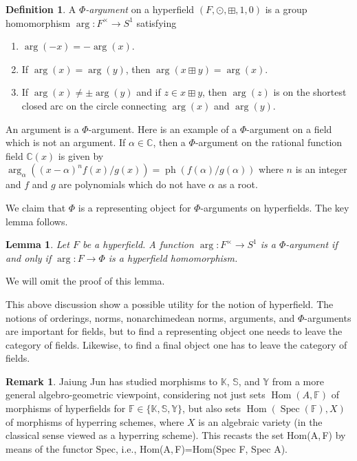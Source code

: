 \documentclass[10pt, preprint]{article}
\newtheorem{lemma}[theorem]{Lemma}
\theoremstyle{definition}
\newtheorem{definition}[theorem]{Definition}
\newtheorem{remark}[theorem]{Remark}
\begin{document}
\begin{definition}
A \emph{$\Phi $-argument} on a hyperfield $(F,\odot ,\boxplus ,1,0)$ is
a group homomorphism $\arg : F^{\times }\to S^{1}$ satisfying\vspace*{-3pt}
%
\begin{enumerate}%
\item
$\arg (-x) = -\arg (x)$.
%
\item
If $\arg (x) = \arg (y)$, then $\arg (x \boxplus y) = \arg (x)$.
%
\item
If $\arg (x) \neq \pm \arg (y)$ and if $z \in x \boxplus y$, then
$\arg (z)$ is on the shortest closed arc on the circle connecting
$\arg (x)$ and $\arg (y)$.\vspace*{-3pt}
\end{enumerate}
%
\end{definition}

An argument is a $\Phi $-argument. Here is an example of a
$\Phi $-argument on a field which is not an argument. If $\alpha
\in \mathbb{C}$, then a $\Phi $-argument on the rational function field
$\mathbb{C}(x)$ is given by $\arg _{\alpha } ((x-\alpha )^{n}f(x)/g(x))
= \operatorname{ph}(f(\alpha )/g(\alpha ))$ where $n$ is an integer and
$f$ and $g$ are polynomials which do not have $\alpha $ as a root.

We claim that $\Phi $ is a representing object for $\Phi $-arguments on
hyperfields. The key lemma follows.\vspace*{-2pt}

\begin{lemma}
Let $F$ be a hyperfield. A function $\arg : F^{\times }\to S^{1}$ is a
$\Phi $-argument if and only if $\arg : F \to \Phi $ is a hyperfield
homomorphism.\vspace*{-2pt}
\end{lemma}

We will omit the proof of this lemma.

This above discussion show a possible utility for the notion of
hyperfield. The notions of orderings, norms, nonarchimedean norms,
arguments, and $\Phi $-arguments are important for fields, but to find
a representing object one needs to leave the category of fields.
Likewise, to find a final object one has to leave the category of fields.\vspace*{-2pt}

\begin{remark}
Jaiung Jun \cite{jjun17} has studied morphisms to $\mathbb{K}$,
$\mathbb{S}$, and $\mathbb{Y}$ from a more general algebro-geometric
viewpoint, considering not just sets $\operatorname{Hom}(A,
\mathbb{F})$ of morphisms of hyperfields for $\mathbb{F}\in \{
\mathbb{K},\mathbb{S}, \mathbb{Y}\}$, but also sets $
\operatorname{Hom}(\operatorname{Spec}(\mathbb{F}), X)$ of morphisms of
hyperring schemes, where $X$ is an algebraic variety (in the classical
sense viewed as a hyperring scheme). This recasts the set Hom(A,\,F) by
means of the functor Spec, i.e., Hom(A,\,F)=Hom(Spec F, Spec A).\vspace*{-2pt}
\end{remark}
\end{document}
